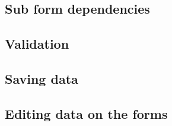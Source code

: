 \subsection{Sub form dependencies}
	
\subsection{Validation}
	
\subsection{Saving data}

\subsection{Editing data on the forms}













